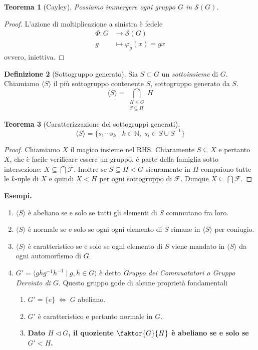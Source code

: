 \documentclass[a4paper]{article}
\newtheorem{theorem}{Teorema}[section]
\theoremstyle{remark}
\theoremstyle{definition}
\newtheorem{definition}[theorem]{Definizione}
\newcommand{\fun}[5]{\begin{align*}
	#1 \colon #2 &\to #3 \\
	#4 &\mapsto #5
	\end{align*}}
\begin{document}
\begin{multicols}{2}
\begin{theorem}[Cayley]\label{Cayley}
	Possiamo immergere ogni gruppo $ G $ in $ \mathcal{S}(G) $.
\end{theorem}
\begin{proof}
	L'azione di moltiplicazione a sinistra è fedele
	 \fun{\Phi}{G}{\mathcal{S}(G)}{g}{\varphi_g(x) = gx}
	ovvero, iniettiva.
\end{proof}

\begin{definition}[Sottogruppo generato]
	Sia $ S \subset G $ un \emph{sottoinsieme} di $ G $. Chiamiamo $ \langle S \rangle $ il più sottogruppo contenente $ S $, sottogruppo generato da $ S $. \[ \langle S \rangle = \bigcap_{\substack{H \leq G \\ S \subseteq H }} H  \]
\end{definition}
\begin{theorem}[Caratterizzazione dei sottogruppi generati]
	\[ \langle S \rangle = \{ s_1 \cdots s_k \mid k \in \mathbb{N}, \; s_i \in S \cup S^{-1} \} \]
\end{theorem}
\begin{proof}
	Chiamiamo $ X $ il magico insieme nel RHS. Chiaramente $ S \subseteq X $ e pertanto $ X $, che è facile verificare essere un gruppo, è parte della famiglia sotto intersezione: $ X \subseteq \bigcap \mathcal{F} $. Inoltre se $S \subseteq H < G $ sicuramente in $ H $ compaiono tutte le $ k $-uple di $ X $ e quindi $ X < H $ per ogni sottogruppo di $ \mathcal{F} $. Dunque $ X \subseteq \bigcap\mathcal{F} $.
\end{proof}

\textbf{Esempi.}
\begin{enumerate}
	\item $ \langle S \rangle $ è abeliano se e solo se tutti gli elementi di $ S $ commutano fra loro.
	\item $ \langle S \rangle $ è normale se e solo se ogni ogni elemento di $ S $ rimane in $ \langle S \rangle $ per coniugio.
	\item $ \langle S \rangle $ è caratteristico se e solo se ogni elemento di $ S $ viene mandato in $ \langle S \rangle $ da ogni automorfismo di $ G $.
	\item $ G' = \langle ghg^{-1}h^{-1} \mid g, h \in G \rangle $ è detto \emph{Gruppo dei Commuatatori o Gruppo Derviato di $ G $}. Questo gruppo gode di alcune proprietà fondamentali
	
	\begin{enumerate}
		\item $ G' = \{ e \} \;\Leftrightarrow\; G $ abeliano.
		\item $ G' $ è caratteristico e pertanto normale in $ G $.
		\item \textbf{Dato $ H \lhd G $, il quoziente $ \faktor{G}{H} $ è abeliano se e solo se $ G' < H $.}
	

\end{enumerate}
\end{enumerate}
\end{multicols}
\end{document}
